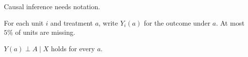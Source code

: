 Causal inference needs notation. %
\begin{defn}\label{def:po}
For each unit \(i\) and treatment \(a\), write \(Y_i(a)\) for the outcome under \(a\).
At most \(5\%\) of units are missing. %
\end{defn}

\begin{assump}[Unconfoundedness]\label{ass:unconf}
\(Y(a) \perp A \mid X\) holds for every \(a\).
\end{assump}

